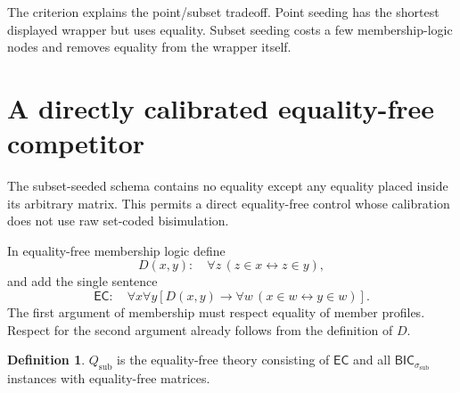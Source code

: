 \documentclass[11pt,letterpaper]{article}
\theoremstyle{definition}\newtheorem{definition}[theorem]{Definition}
\theoremstyle{remark}\newtheorem{remark}[theorem]{Remark}
\newcommand{\BIC}{\mathsf{BIC}}
\newcommand{\EC}{\mathsf{EC}}
\newcommand{\QTsub}{Q_{\mathrm{sub}}}
\begin{document}
The criterion explains the point/subset tradeoff. Point seeding has the
shortest displayed wrapper but uses equality. Subset seeding costs a few
membership-logic nodes and removes equality from the wrapper itself.

\section{A directly calibrated equality-free competitor}
\label{sec:equalityfree}

The subset-seeded schema contains no equality except any equality placed
inside its arbitrary matrix. This permits a direct equality-free control
whose calibration does not use raw set-coded bisimulation.

In equality-free membership logic define
\begin{equation}\label{eq:D}
 D(x,y):\quad\forall z\,(z\in x\leftrightarrow z\in y),
\end{equation}
and add the single sentence
\begin{equation}\label{eq:EC}
 \EC:\quad\forall x\forall y
 \left[D(x,y)\to\forall w\,(x\in w\leftrightarrow y\in w)\right].
\end{equation}
The first argument of membership must respect equality of member
profiles. Respect for the second argument already follows from the
definition of $D$.

\begin{definition}
$\QTsub$ is the equality-free theory consisting of $\EC$ and all
$\BIC_{\sigma_{\mathrm{sub}}}$ instances with equality-free matrices.
\end{definition}
\end{document}
